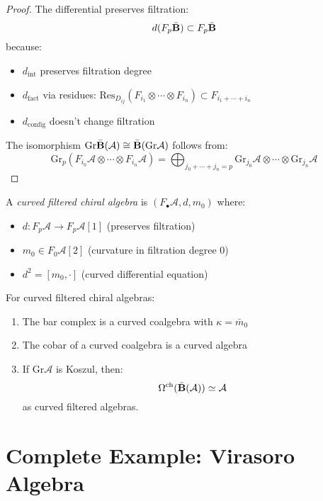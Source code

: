 \begin{proof}
The differential preserves filtration:
$$d(F_p\bar{\mathbf{B}}) \subset F_p\bar{\mathbf{B}}$$
because:
\begin{itemize}
\item $d_{\text{int}}$ preserves filtration degree
\item $d_{\text{fact}}$ via residues: $\text{Res}_{D_{ij}}(F_{i_1} \otimes \cdots \otimes F_{i_n}) \subset F_{i_1 + \cdots + i_n}$
\item $d_{\text{config}}$ doesn't change filtration
\end{itemize}

The isomorphism $\text{Gr}\bar{\mathbf{B}}(\mathcal{A}) \cong \bar{\mathbf{B}}(\text{Gr}\mathcal{A})$ follows from:
$$\text{Gr}_p(F_{i_0}\mathcal{A} \otimes \cdots \otimes F_{i_n}\mathcal{A}) = \bigoplus_{j_0 + \cdots + j_n = p} \text{Gr}_{j_0}\mathcal{A} \otimes \cdots \otimes \text{Gr}_{j_n}\mathcal{A}$$
\end{proof}

\begin{definition}
A \emph{curved filtered chiral algebra} is $(F_\bullet\mathcal{A}, d, m_0)$ where:
\begin{itemize}
\item $d: F_p\mathcal{A} \to F_p\mathcal{A}[1]$ (preserves filtration)
\item $m_0 \in F_0\mathcal{A}[2]$ (curvature in filtration degree 0)
\item $d^2 = [m_0, \cdot]$ (curved differential equation)
\end{itemize}
\end{definition}

\begin{theorem}
For curved filtered chiral algebras:
\begin{enumerate}
\item The bar complex is a curved coalgebra with $\kappa = \bar{m}_0$
\item The cobar of a curved coalgebra is a curved algebra
\item If $\text{Gr}\mathcal{A}$ is Koszul, then:
$$\Omega^{\text{ch}}(\bar{\mathbf{B}}(\mathcal{A})) \simeq \mathcal{A}$$
as curved filtered algebras.
\end{enumerate}
\end{theorem}

\section{Complete Example: Virasoro Algebra}

